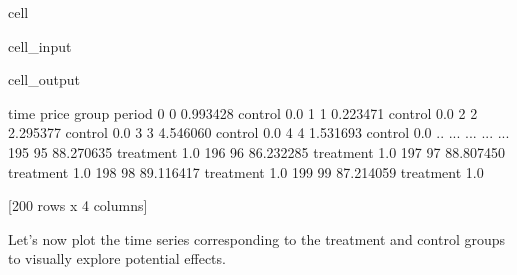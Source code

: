 \documentclass[letterpaper,10pt,english]{jupyterBook}
\begin{document}
\begin{sphinxuseclass}{cell}
\begin{sphinxVerbatimInput}
\begin{sphinxuseclass}{cell_input}
\begin{sphinxVerbatim}[commandchars=\\\{\}]
  
      
     \PYG{p}{[} \PYG{p}{]}
     \PYG{p}{[} \PYG{p}{]} 
     \PYG{p}{[}       \PYG{p}{]}

\end{sphinxVerbatim}

\end{sphinxuseclass}\end{sphinxVerbatimInput}
\begin{sphinxVerbatimOutput}

\begin{sphinxuseclass}{cell_output}
\begin{sphinxVerbatim}[commandchars=\\\{\}]
     time      price      group  period
0       0   0.993428    control     0.0
1       1   0.223471    control     0.0
2       2   2.295377    control     0.0
3       3   4.546060    control     0.0
4       4   1.531693    control     0.0
..    ...        ...        ...     ...
195    95  88.270635  treatment     1.0
196    96  86.232285  treatment     1.0
197    97  88.807450  treatment     1.0
198    98  89.116417  treatment     1.0
199    99  87.214059  treatment     1.0

[200 rows x 4 columns]
\end{sphinxVerbatim}

\end{sphinxuseclass}\end{sphinxVerbatimOutput}

\end{sphinxuseclass}
\sphinxAtStartPar
Let’s now plot the time series corresponding to the treatment and control groups to visually explore potential effects.
\end{document}
